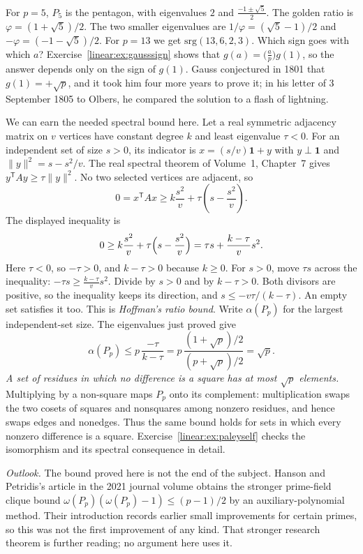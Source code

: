For $p=5$, $P_5$ is the pentagon, with eigenvalues $2$ and $\frac{-1\pm\sqrt5}2$. The golden ratio is $\varphi=(1+\sqrt5)/2$. The two smaller eigenvalues are $1/\varphi=(\sqrt5-1)/2$ and $-\varphi=(-1-\sqrt5)/2$. For $p=13$ we get
$\mathrm{srg}(13,6,2,3)$. Which sign goes with which $a$? Exercise~\ref{linear:ex:gausssign} shows that $g(a)=\bigl(\frac ap\bigr)g(1)$,
so the answer depends only on the sign of $g(1)$. Gauss conjectured in 1801 that $g(1)=+\sqrt p$, and it took him four more years
to prove it; in his letter of 3 September 1805 to Olbers, he compared the solution to a flash of lightning.

We can earn the needed spectral bound here. Let a real symmetric adjacency
matrix on $v$ vertices have constant degree $k$ and least eigenvalue $\tau<0$.
For an independent set of size $s>0$, its indicator is
$x=(s/v)\mathbf1+y$ with $y\perp\mathbf1$ and $\|y\|^2=s-s^2/v$.
The real spectral theorem of Volume~1, Chapter~7 gives
$y^{\mathsf T}Ay\ge\tau\|y\|^2$. No two selected vertices are adjacent, so
\[
0=x^{\mathsf T}Ax\ge k\frac{s^2}{v}
  +\tau\left(s-\frac{s^2}{v}\right).
\]
The displayed inequality is
\[
0\ge k\frac{s^2}{v}+\tau\Bigl(s-\frac{s^2}{v}\Bigr)
=\tau s+\frac{k-\tau}v s^2.
\]
Here $\tau<0$, so $-\tau>0$, and $k-\tau>0$ because $k\ge0$. For $s>0$, move $\tau s$ across the inequality:
$-\tau s\ge\frac{k-\tau}v s^2$.
Divide by $s>0$ and by $k-\tau>0$. Both divisors are positive, so the inequality keeps its direction, and
$s\le-v\tau/(k-\tau)$. An empty set satisfies it too.
This is \emph{Hoffman's ratio bound}. Write $\alpha(P_p)$ for the largest
independent-set size. The eigenvalues just proved give
\[
\alpha(P_p)\le p\,\frac{-\tau}{k-\tau}=p\,\frac{(1+\sqrt p)/2}{(p+\sqrt p)/2}=\sqrt p.
\]
\emph{A set of residues in which no difference is a square has at most $\sqrt p$ elements.} Multiplying by a non-square maps
$P_p$ onto its complement: multiplication swaps the two cosets of squares
and nonsquares among nonzero residues, and hence swaps edges and nonedges.
Thus the same bound holds for sets in which every nonzero difference is a
square. Exercise~\ref{linear:ex:paleyself} checks the isomorphism and its
spectral consequence in detail.

\begin{remark}
\emph{Outlook.} The bound proved here is not the end of the subject.
Hanson and Petridis's article in the 2021 journal volume obtains the stronger prime-field
clique bound $\omega(P_p)(\omega(P_p)-1)\le(p-1)/2$ by an auxiliary-polynomial
method. Their introduction records earlier small improvements for certain
primes, so this was not the first improvement of any kind. That stronger
research theorem is further reading; no argument here uses it.
\end{remark}

